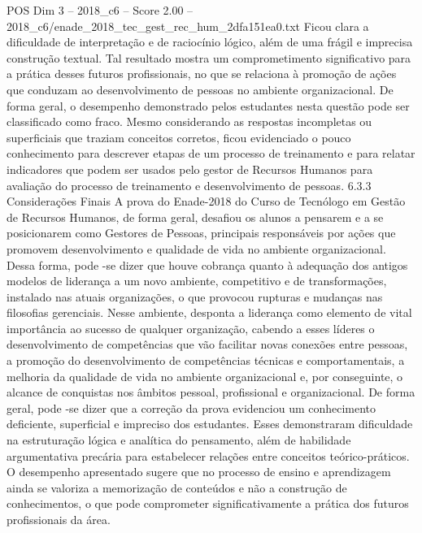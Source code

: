 \begin{textsample}{POS Dim 3 – 2018\_c6 – Score 2.00 – 2018\_c6/enade\_2018\_tec\_gest\_rec\_hum\_2dfa151ea0.txt}
Ficou clara a dificuldade de interpretação e de raciocínio lógico, além de uma frágil e imprecisa construção textual.
Tal resultado mostra um comprometimento significativo para a prática desses futuros profissionais, no que se relaciona à promoção de ações que conduzam ao desenvolvimento de pessoas no ambiente organizacional.
De forma geral, o desempenho demonstrado pelos estudantes nesta questão pode ser classificado como fraco.
Mesmo considerando as respostas incompletas ou superficiais que traziam conceitos corretos, ficou evidenciado o pouco conhecimento para descrever etapas de um processo de treinamento e para relatar indicadores que podem ser usados pelo gestor de Recursos Humanos para avaliação do processo de treinamento e desenvolvimento de pessoas. 6.3.3 Considerações Finais A prova do Enade-2018 do Curso de Tecnólogo em Gestão de Recursos Humanos, de forma geral, desafiou os alunos a pensarem e a se posicionarem como Gestores de Pessoas, principais responsáveis por ações que promovem desenvolvimento e qualidade de vida no ambiente organizacional.
Dessa forma, pode -se dizer que houve cobrança quanto à adequação dos antigos modelos de liderança a um novo ambiente, competitivo e de transformações, instalado nas atuais organizações, o que provocou rupturas e mudanças nas filosofias gerenciais.
Nesse ambiente, desponta a liderança como elemento de vital importância ao sucesso de qualquer organização, cabendo a esses líderes o desenvolvimento de competências que vão facilitar novas conexões entre pessoas, a promoção do desenvolvimento de competências técnicas e comportamentais, a melhoria da qualidade de vida no ambiente organizacional e, por conseguinte, o alcance de conquistas nos âmbitos pessoal, profissional e organizacional.
De forma geral, pode -se dizer que a correção da prova evidenciou um conhecimento deficiente, superficial e impreciso dos estudantes.
Esses demonstraram dificuldade na estruturação lógica e analítica do pensamento, além de habilidade argumentativa precária para estabelecer relações entre conceitos teórico-práticos.
O desempenho apresentado sugere que no processo de ensino e aprendizagem ainda se valoriza a memorização de conteúdos e não a construção de conhecimentos, o que pode comprometer significativamente a prática dos futuros profissionais da área.

\end{textsample}
